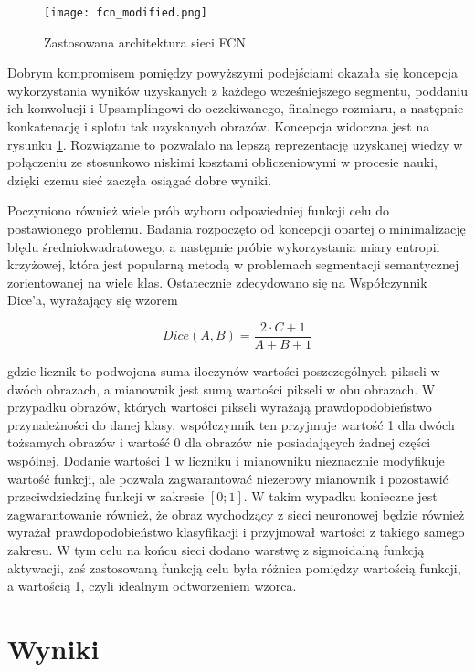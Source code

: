 \documentclass{article}
\begin{document}
\begin{figure}[H]
\begin{center}
\texttt{[image: fcn\_modified.png]}
\end{center}
\caption{Zastosowana architektura sieci FCN}
\label{fig:mod}
\end{figure}

Dobrym kompromisem pomiędzy powyższymi podejściami okazała się koncepcja wykorzystania wyników uzyskanych z każdego wcześniejszego segmentu, poddaniu ich konwolucji i Upsamplingowi do oczekiwanego, finalnego rozmiaru, a następnie konkatenację i splotu tak uzyskanych obrazów. Koncepcja widoczna jest na rysunku \ref{fig:mod}. Rozwiązanie to pozwalało na lepszą reprezentację uzyskanej wiedzy w połączeniu ze stosunkowo niskimi kosztami obliczeniowymi w procesie nauki, dzięki czemu sieć zaczęła osiągać dobre wyniki.

Poczyniono również wiele prób wyboru odpowiedniej funkcji celu do postawionego problemu. Badania rozpoczęto od koncepcji opartej o minimalizację błędu średniokwadratowego,  a następnie próbie wykorzystania miary entropii krzyżowej, która jest popularną metodą w problemach segmentacji semantycznej zorientowanej na wiele klas. Ostatecznie zdecydowano się na Współczynnik Dice'a, wyrażający się wzorem

\[ Dice(A, B) = \frac{2 \cdot C + 1}{A + B + 1}\]

gdzie licznik to podwojona suma iloczynów wartości poszczególnych pikseli w dwóch obrazach, a mianownik jest sumą wartości pikseli w obu obrazach. W przypadku obrazów, których wartości pikseli wyrażają prawdopodobieństwo przynależności do danej klasy, współczynnik ten przyjmuje wartość 1 dla dwóch tożsamych obrazów i wartość 0 dla obrazów nie posiadających żadnej części wspólnej. Dodanie wartości 1 w liczniku i mianowniku nieznacznie modyfikuje wartość funkcji, ale pozwala zagwarantować niezerowy mianownik i pozostawić przeciwdziedzinę funkcji w zakresie $[0 ; 1]$. W takim wypadku konieczne jest zagwarantowanie również, że obraz wychodzący z sieci neuronowej będzie również wyrażał prawdopodobieństwo klasyfikacji i przyjmował wartości z takiego samego zakresu. W tym celu na końcu sieci dodano warstwę z sigmoidalną funkcją aktywacji, zaś zastosowaną funkcją celu była różnica pomiędzy wartością funkcji, a wartością 1, czyli idealnym odtworzeniem wzorca.

\section{Wyniki}
\end{document}
